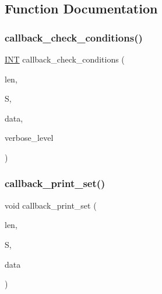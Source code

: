 \subsection{Function Documentation}
\mbox{\label{_o_v_o_i_d_2ovoid_8_c_ae3d42bbe9fc8a3eaf61cf43d52cb8613}} 
\subsubsection{\texorpdfstring{callback\+\_\+check\+\_\+conditions()}{callback\_check\_conditions()}}
{\footnotesize\ttfamily \mbox{\hyperlink{galois_8h_a09fddde158a3a20bd2dcadb609de11dc}{I\+NT}} callback\+\_\+check\+\_\+conditions (\begin{DoxyParamCaption}\item[{\mbox{\hyperlink{galois_8h_a09fddde158a3a20bd2dcadb609de11dc}{I\+NT}}}]{len,  }\item[{\mbox{\hyperlink{galois_8h_a09fddde158a3a20bd2dcadb609de11dc}{I\+NT}} $\ast$}]{S,  }\item[{void $\ast$}]{data,  }\item[{\mbox{\hyperlink{galois_8h_a09fddde158a3a20bd2dcadb609de11dc}{I\+NT}}}]{verbose\+\_\+level }\end{DoxyParamCaption})}

\mbox{\label{_o_v_o_i_d_2ovoid_8_c_a0d469d33882a9fcc74da463afe8dd36f}} 
\subsubsection{\texorpdfstring{callback\+\_\+print\+\_\+set()}{callback\_print\_set()}}
{\footnotesize\ttfamily void callback\+\_\+print\+\_\+set (\begin{DoxyParamCaption}\item[{\mbox{\hyperlink{galois_8h_a09fddde158a3a20bd2dcadb609de11dc}{I\+NT}}}]{len,  }\item[{\mbox{\hyperlink{galois_8h_a09fddde158a3a20bd2dcadb609de11dc}{I\+NT}} $\ast$}]{S,  }\item[{void $\ast$}]{data }\end{DoxyParamCaption})}

